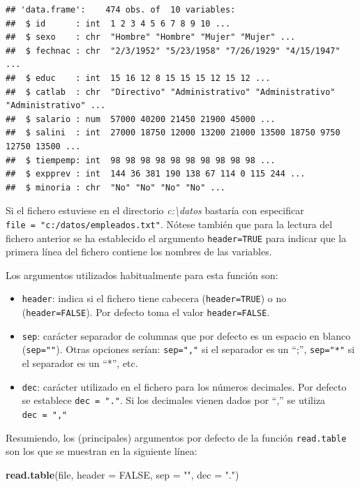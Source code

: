 \documentclass[
]{book}
\newenvironment{Shaded}{\begin{snugshade}}{\end{snugshade}}
\newcommand{\DataTypeTok}[1]{\textcolor[rgb]{0.13,0.29,0.53}{#1}}
\newcommand{\KeywordTok}[1]{\textcolor[rgb]{0.13,0.29,0.53}{\textbf{#1}}}
\newcommand{\NormalTok}[1]{#1}
\newcommand{\OtherTok}[1]{\textcolor[rgb]{0.56,0.35,0.01}{#1}}
\newcommand{\StringTok}[1]{\textcolor[rgb]{0.31,0.60,0.02}{#1}}
\begin{document}
\begin{verbatim}
## 'data.frame':    474 obs. of  10 variables:
##  $ id      : int  1 2 3 4 5 6 7 8 9 10 ...
##  $ sexo    : chr  "Hombre" "Hombre" "Mujer" "Mujer" ...
##  $ fechnac : chr  "2/3/1952" "5/23/1958" "7/26/1929" "4/15/1947" ...
##  $ educ    : int  15 16 12 8 15 15 15 12 15 12 ...
##  $ catlab  : chr  "Directivo" "Administrativo" "Administrativo" "Administrativo" ...
##  $ salario : num  57000 40200 21450 21900 45000 ...
##  $ salini  : int  27000 18750 12000 13200 21000 13500 18750 9750 12750 13500 ...
##  $ tiempemp: int  98 98 98 98 98 98 98 98 98 98 ...
##  $ expprev : int  144 36 381 190 138 67 114 0 115 244 ...
##  $ minoria : chr  "No" "No" "No" "No" ...
\end{verbatim}

Si el fichero estuviese en el directorio \emph{c:\textbackslash datos} bastaría con especificar
\texttt{file\ =\ "c:/datos/empleados.txt"}.
Nótese también que para la lectura del fichero anterior se ha
establecido el argumento \texttt{header=TRUE} para indicar que la primera línea del
fichero contiene los nombres de las variables.

Los argumentos utilizados habitualmente para esta función son:

\begin{itemize}
\item
  \texttt{header}: indica si el fichero tiene cabecera (\texttt{header=TRUE}) o no
  (\texttt{header=FALSE}). Por defecto toma el valor \texttt{header=FALSE}.
\item
  \texttt{sep}: carácter separador de columnas que por defecto es un espacio
  en blanco (\texttt{sep=""}). Otras opciones serían: \texttt{sep=","} si el separador es
  un ``;'', \texttt{sep="*"} si el separador es un ``*'', etc.
\item
  \texttt{dec}: carácter utilizado en el fichero para los números decimales.
  Por defecto se establece \texttt{dec\ =\ "."}. Si los decimales vienen dados
  por ``,'' se utiliza \texttt{dec\ =\ ","}
\end{itemize}

Resumiendo, los (principales) argumentos por defecto de la función
\texttt{read.table} son los que se muestran en la siguiente línea:

\begin{Shaded}
\begin{Highlighting}[]
\KeywordTok{read.table}\NormalTok{(file, }\DataTypeTok{header =} \OtherTok{FALSE}\NormalTok{, }\DataTypeTok{sep =} \StringTok{""}\NormalTok{, }\DataTypeTok{dec =} \StringTok{"."}\NormalTok{)  }
\end{Highlighting}
\end{Shaded}
\end{document}
